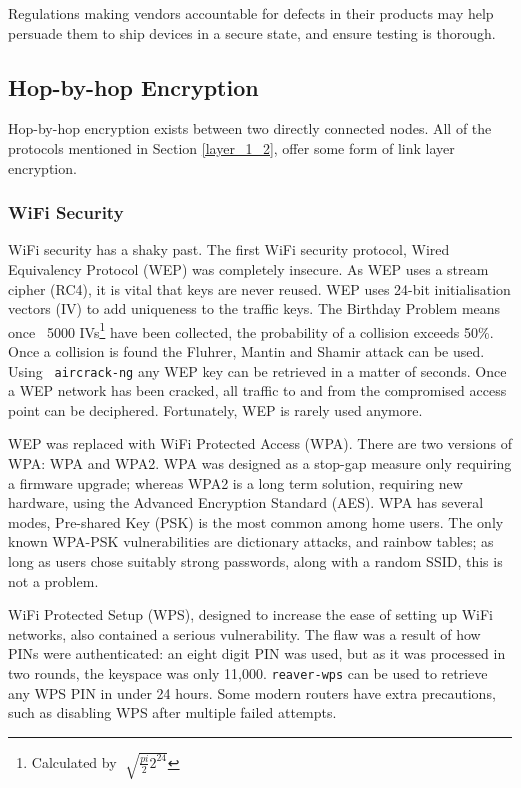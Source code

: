 \documentclass[10pt,journal,compsoc]{IEEEtran}
\begin{document}
Regulations making vendors accountable for defects in their products may help
persuade them to ship devices in a secure state, and ensure testing is
thorough. 

\subsection{Hop-by-hop Encryption}
Hop-by-hop encryption exists between two directly connected nodes. All of the
protocols mentioned in Section \ref{layer_1_2}, offer some form of link layer
encryption. 

\subsubsection{WiFi Security}
WiFi security has a shaky past. The first WiFi security protocol, Wired
Equivalency Protocol (WEP) was completely insecure. As WEP uses a stream cipher
(RC4), it is vital that keys are never reused. WEP uses 24-bit initialisation
vectors (IV) to add uniqueness to the traffic keys. The Birthday Problem means
once ~5000 IVs\footnote{Calculated by $\sqrt[]{\frac{pi}{2} 2^{24}} $} have
been collected, the probability of a collision exceeds 50\%.  Once a collision
is found the Fluhrer, Mantin and Shamir attack can be used.  Using {\tt
aircrack-ng} any WEP key can be retrieved in a matter of seconds. Once a WEP
network has been cracked, all traffic to and from the compromised access point
can be deciphered. Fortunately, WEP is rarely used anymore.

WEP was replaced with WiFi Protected Access (WPA). There are two versions of
WPA: WPA and WPA2. WPA was designed as a stop-gap measure only requiring a
firmware upgrade; whereas WPA2 is a long term solution, requiring new hardware,
using the Advanced Encryption Standard (AES). WPA has several modes, Pre-shared
Key (PSK) is the most common among home users. The only known WPA-PSK
vulnerabilities are dictionary attacks, and rainbow tables; as long as users
chose suitably strong passwords, along with a random SSID, this is not a
problem. 

WiFi Protected Setup (WPS), designed to increase the ease of setting up WiFi
networks, also contained a serious vulnerability.  The flaw was a result of how
PINs were authenticated: an eight digit PIN was used, but as it was processed
in two rounds, the keyspace was only 11,000. {\tt reaver-wps} can be used to
retrieve any WPS PIN in under 24 hours. Some modern routers have extra
precautions, such as disabling WPS after multiple failed attempts. 
\end{document}
